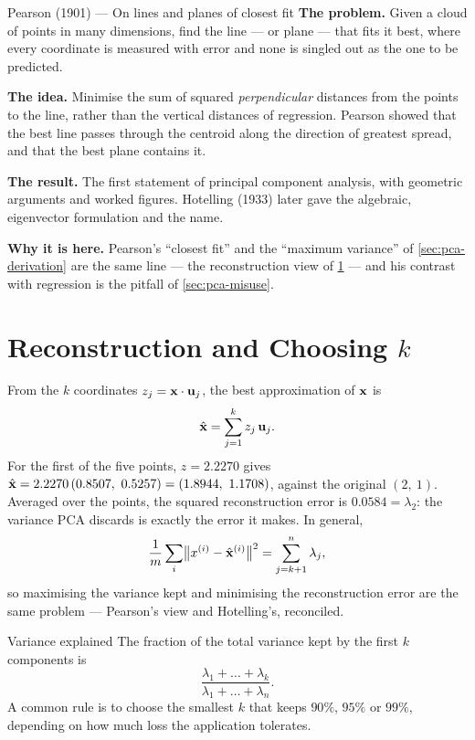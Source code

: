 \begin{researchspotlight}{Pearson (1901) --- On lines and planes of closest fit}
\textbf{The problem.} Given a cloud of points in many dimensions, find the line ---
or plane --- that fits it best, where every coordinate is measured with error and
none is singled out as the one to be predicted.

\textbf{The idea.} Minimise the sum of squared \emph{perpendicular} distances from
the points to the line, rather than the vertical distances of regression. Pearson
showed that the best line passes through the centroid along the direction of
greatest spread, and that the best plane contains it.

\textbf{The result.} The first statement of principal component analysis, with
geometric arguments and worked figures. Hotelling (1933) later gave the
algebraic, eigenvector formulation and the name.

\textbf{Why it is here.} Pearson's ``closest fit'' and the ``maximum variance'' of
\cref{sec:pca-derivation} are the same line --- the reconstruction view of
\cref{sec:reconstruction} --- and his contrast with regression is the pitfall of
\cref{sec:pca-misuse}.
\parencite{pearson1901}
\end{researchspotlight}

\section{Reconstruction and Choosing \texorpdfstring{$k$}{k}}
\label{sec:reconstruction}

From the $k$ coordinates $z_j = \mathbf{x}\cdot\mathbf{u}_j$, the best approximation of
$\mathbf{x}$ is
\[
  \hat{\mathbf{x}} = \sum_{j=1}^{k} z_j\,\mathbf{u}_j .
\]
For the first of the five points, $z = 2.2270$ gives $\hat{\mathbf{x}} = 2.2270\,(0.8507,\
0.5257) = (1.8944,\ 1.1708)$, against the original $(2,\ 1)$. Averaged over the
points, the squared reconstruction error is $0.0584 = \lambda_2$: the variance
PCA discards is exactly the error it makes. In general,
\[
  \frac1m\sum_i\bigl\|x^{(i)} - \hat{\mathbf{x}}^{(i)}\bigr\|^2 = \sum_{j=k+1}^{n}\lambda_j ,
\]
so maximising the variance kept and minimising the reconstruction error are the
same problem --- Pearson's view and Hotelling's, reconciled.

\begin{defbox}{Variance explained}
The fraction of the total variance kept by the first $k$ components is
\[
  \frac{\lambda_1 + \dots + \lambda_k}{\lambda_1 + \dots + \lambda_n} .
\]
A common rule is to choose the smallest $k$ that keeps $90\%$, $95\%$ or $99\%$,
depending on how much loss the application tolerates.
\end{defbox}


